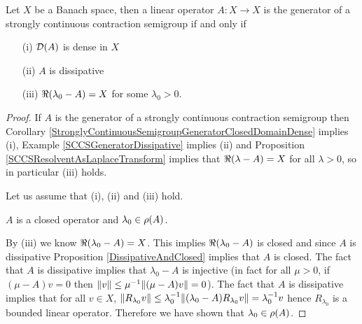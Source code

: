\begin{thm}\label{HilleYosidaTheorem}Let $X$ be a Banach space, then a linear operator $A : X \to X$ is the generator of a strongly continuous contraction semigroup if and only if 
\begin{itemize}
\item[(i)] $ \mathcal{D}(A)$ is dense in $X$
\item[(ii)] $A$ is dissipative
\item[(iii)] $\Re(\lambda_0 -A) = X$ for some $\lambda_0 > 0$.
\end{itemize}
\end{thm}
\begin{proof}
If $A$ is the generator of a strongly continuous contraction semigroup then Corollary \ref{StronglyContinuousSemigroupGeneratorClosedDomainDense} implies (i), Example \ref{SCCSGeneratorDissipative} implies (ii) and Proposition \ref{SCCSResolventAsLaplaceTransform} implies that $\Re(\lambda -A) = X$ for all $\lambda > 0$, so in particular (iii) holds.

Let us assume that (i), (ii) and (iii) hold.  

\begin{clm} $A$ is a closed operator and $\lambda_0 \in \rho(A)$.
\end{clm}
By (iii) we know $\Re(\lambda_0 -A) = X$.  This implies $\Re(\lambda_0 -A)$ is closed and since $A$ is dissipative Proposition \ref{DissipativeAndClosed} implies that $A$ is closed.  The fact that $A$ is dissipative implies that $\lambda_0 -A$ is injective (in fact for all $\mu > 0$, if $(\mu -A)v=0$ then $\lVert v \rVert \leq \mu^{-1} \lVert (\mu -A)v \rVert = 0$).  The fact that $A$ is dissipative implies that for all $v \in X$, $\lVert R_{\lambda_0} v \rVert \leq \lambda_0^{-1} \lVert (\lambda_0 -A)R_{\lambda_0} v \rVert = \lambda_0^{-1} v$ hence $R_{\lambda_0}$ is a bounded linear operator.  Therefore we have shown that $\lambda_0 \in \rho(A)$.


\end{proof}
